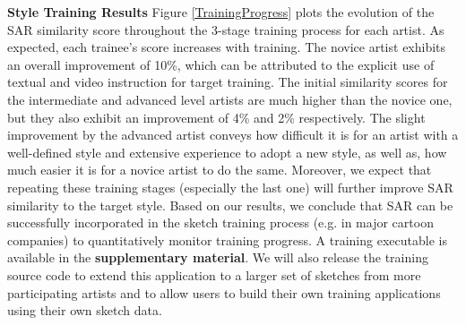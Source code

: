 

\noindent\textbf{Style Training Results} Figure \ref{TrainingProgress} plots the evolution of the SAR similarity score throughout the 3-stage training process for each artist. As expected, each trainee's score increases with training. The novice artist exhibits an overall improvement of 10\%, which can be attributed to the explicit use of textual and video instruction for target training. The initial similarity scores for the intermediate and advanced level artists are much higher than the novice one, but they also exhibit an improvement of 4\% and 2\% respectively. The slight improvement by the advanced artist conveys how difficult it is for an artist with a well-defined style and extensive experience to adopt a new style, as well as, how much easier it is for a novice artist to do the same. Moreover, we expect that repeating these training stages (especially the last one) will further improve SAR similarity to the target style. Based on our results, we conclude that SAR can be successfully incorporated in the sketch training process (e.g. in major cartoon companies) to quantitatively monitor training progress. A training executable is available in the \textbf{supplementary material}. We will also release the training source code to extend this application to a larger set of sketches from more participating artists and to allow users to build their own training applications using their own sketch data.



